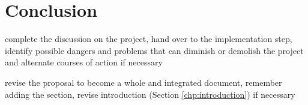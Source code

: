 \chapter{Conclusion}
\label{chp:conclusion}


\begin{shaded}
\noindent
complete the discussion on the project, hand over to the implementation step, identify possible dangers and problems that can diminish or demolish the project and alternate courses of action if necessary

\medskip
\noindent
revise the proposal to become a whole and integrated document, remember adding the  section, revise introduction (Section \ref{chp:introduction}) if necessary
\end{shaded}

\lipsum[31]
